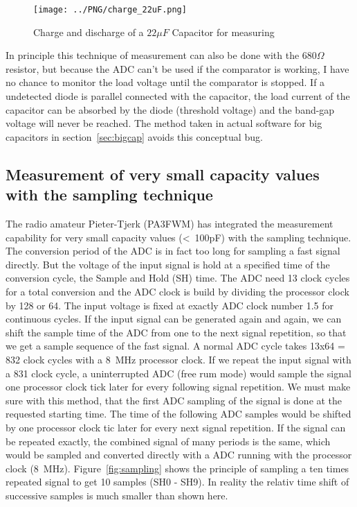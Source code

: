 \begin{figure}[H]
  \centering
    \texttt{[image: ../PNG/charge\_22uF.png]}
  \caption{Charge and discharge of a \(22\mu F\) Capacitor for measuring}
  \label{pic:c22uF}
\end{figure}


In principle this technique of measurement can also be done with the \(680\Omega\) resistor, but 
because the ADC can't be used if the comparator is working, I have no chance to monitor the
load voltage until the comparator is stopped. If a undetected diode is parallel connected with
the capacitor, the load current of the capacitor can be absorbed by the diode (threshold voltage) and
the band-gap voltage will never be reached.
The method taken in actual software for big capacitors in section~\ref{sec:bigcap}
avoids this conceptual bug.

\subsection{Measurement of very small capacity values with the sampling technique}
The radio amateur Pieter-Tjerk (PA3FWM) has integrated the measurement capability for very small
capacity values (\textless~100pF) with the sampling technique.
The conversion period of the ADC is in fact too long for sampling a fast signal directly.
But the voltage of the input signal is hold at a specified time of the conversion cycle,
the Sample and Hold (SH) time.
The ADC need 13 clock cycles for a total conversion and the ADC clock is build by dividing the
processor clock by 128 or 64.
The input voltage is fixed at exactly ADC clock number 1.5 for continuous cycles.
If the input signal can be generated again and again, we can shift the sample time of the ADC from
one to the next signal repetition, so that we get a sample sequence of the fast signal.
A normal ADC cycle takes 13x64 = 832 clock cycles with a 8~MHz processor clock.
If we repeat the input signal with a 831 clock cycle, a uninterrupted ADC (free rum mode) would
sample the signal one processor clock tick later for every following signal repetition.
We must make sure with this method, that the first ADC sampling of the signal is done at
the requested starting time. The time of the following ADC samples would be shifted by one processor clock
tic later for every next signal repetition.
If the signal can be repeated exactly, the combined signal of many periods is the same, 
which would be sampled and converted directly with a ADC running with the processor clock (8~MHz).
Figure~\ref{fig:sampling} shows the principle of sampling a ten times repeated signal
to get 10 samples (SH0 - SH9).
In reality the relativ time shift of successive samples is much smaller than shown here.

